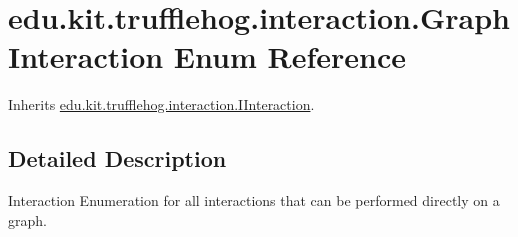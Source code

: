 \hypertarget{enumedu_1_1kit_1_1trufflehog_1_1interaction_1_1_graph_interaction}{}\section{edu.\+kit.\+trufflehog.\+interaction.\+Graph\+Interaction Enum Reference}
\label{enumedu_1_1kit_1_1trufflehog_1_1interaction_1_1_graph_interaction}


Inherits \hyperlink{interfaceedu_1_1kit_1_1trufflehog_1_1interaction_1_1_i_interaction}{edu.\+kit.\+trufflehog.\+interaction.\+I\+Interaction}.



\subsection{Detailed Description}
Interaction Enumeration for all interactions that can be performed directly on a graph. 